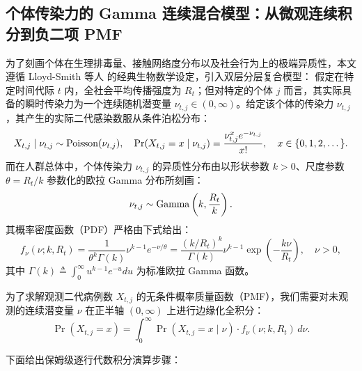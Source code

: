 \subsection{个体传染力的 Gamma 连续混合模型：从微观连续积分到负二项 PMF}
为了刻画个体在生理排毒量、接触网络度分布以及社会行为上的极端异质性，本文遵循 Lloyd-Smith 等人 \citep{lloydsmith2005superspreading} 的经典生物数学设定，引入双层分层复合模型：
假定在特定时间代际 $t$ 内，全社会平均传播强度为 $R_t$；但对特定的个体 $j$ 而言，其实际具备的瞬时传染力为一个连续随机潜变量 $\nu_{t,j} \in (0, \infty)$。给定该个体的传染力 $\nu_{t,j}$，其产生的实际二代感染数服从条件泊松分布：
\begin{equation}
X_{t,j} \mid \nu_{t,j} \sim \operatorname{Poisson}(\nu_{t,j}), \quad \Pr(X_{t,j} = x \mid \nu_{t,j}) = \frac{\nu_{t,j}^x e^{-\nu_{t,j}}}{x!}, \quad x \in \{0, 1, 2, \dots\}.
\end{equation}
而在人群总体中，个体传染力 $\nu_{t,j}$ 的异质性分布由以形状参数 $k > 0$、尺度参数 $\theta = R_t / k$ 参数化的欧拉 Gamma 分布所刻画：
\begin{equation}
\nu_{t,j} \sim \operatorname{Gamma}\left(k, \frac{R_t}{k}\right).
\end{equation}
其概率密度函数（PDF）严格由下式给出：
\begin{equation}
f_\nu(\nu; k, R_t) = \frac{1}{\theta^k \Gamma(k)} \nu^{k-1} e^{-\nu / \theta} = \frac{(k / R_t)^k}{\Gamma(k)} \nu^{k-1} \exp\left( -\frac{k \nu}{R_t} \right), \quad \nu > 0,
\end{equation}
其中 $\Gamma(k) \triangleq \int_0^\infty u^{k-1} e^{-u} du$ 为标准欧拉 Gamma 函数。

为了求解观测二代病例数 $X_{t,j}$ 的无条件概率质量函数（PMF），我们需要对未观测的连续潜变量 $\nu$ 在正半轴 $(0, \infty)$ 上进行边缘化全积分：
\begin{equation}
\Pr(X_{t,j} = x) = \int_0^\infty \Pr(X_{t,j} = x \mid \nu) \cdot f_\nu(\nu; k, R_t) \, d\nu.
\end{equation}

下面给出保姆级逐行代数积分演算步骤：

